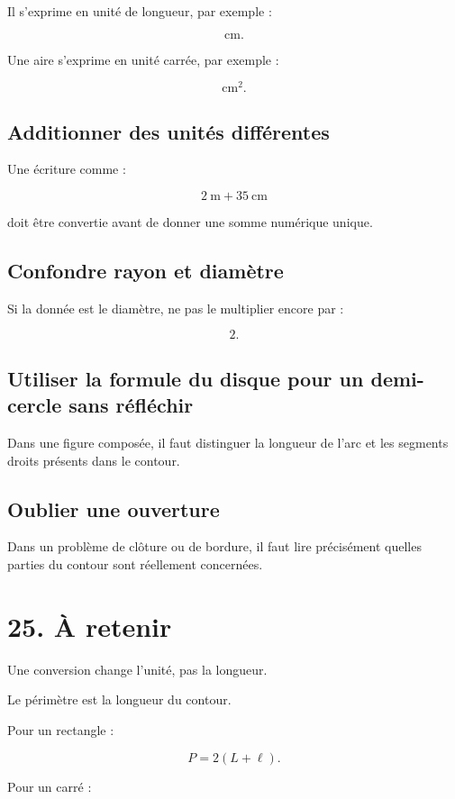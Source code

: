 Il s’exprime en unité de longueur, par exemple :

\[
\text{cm}.
\]

Une aire s’exprime en unité carrée, par exemple :

\[
\text{cm}^2.
\]

\subsection{Additionner des unités différentes}

Une écriture comme :

\[
2\ \text{m}+35\ \text{cm}
\]

doit être convertie avant de donner une somme numérique unique.

\subsection{Confondre rayon et diamètre}

Si la donnée est le diamètre, ne pas le multiplier encore par :

\[
2.
\]

\subsection{Utiliser la formule du disque pour un demi-cercle sans réfléchir}

Dans une figure composée, il faut distinguer la longueur de l’arc et les segments droits présents dans le contour.

\subsection{Oublier une ouverture}

Dans un problème de clôture ou de bordure, il faut lire précisément quelles parties du contour sont réellement concernées.

\section{25. À retenir}

Une conversion change l’unité, pas la longueur.

Le périmètre est la longueur du contour.

Pour un rectangle :

\[
\boxed{P=2(L+\ell)}.
\]

Pour un carré :

